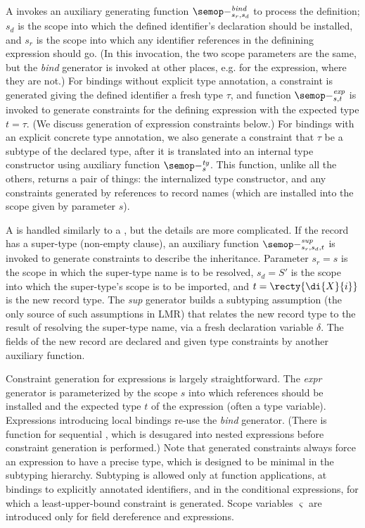 A  invokes an auxiliary generating function $\sema{bind}{-}{s_r,s_d}$ to process the
definition; $s_d$ is the scope into which the defined identifier's declaration should be installed, and $s_r$
is the scope into which any identifier references in the definining expression should go. (In this invocation,
the two scope parameters are the same, but the {\it bind} generator is invoked at other places, e.g.
for the  expression, where they are not.)  For bindings without explicit type annotation,
a constraint is generated giving the defined identifier a fresh type $\tau$, and function $\sema{exp}{-}{s,t}$
is invoked to generate constraints for the defining expression with the expected type $t=\tau$.
(We discuss generation of expression constraints below.)
For bindings with an explicit concrete type annotation, we also generate a constraint that $\tau$ be a subtype
of the declared type, after it is translated into an internal type constructor
using auxiliary function $\sema{ty}{-}{s}$. This function, unlike all the others, returns a pair of things:
the internalized type constructor, and any constraints generated by references to record names (which are
installed into the scope given by parameter $s$).

A  is handled similarly to a , but the details are more complicated. If the
record has a super-type (non-empty  clause), an auxiliary function $\sema{sup}{-}{s_r,s_d,t}$ 
is invoked to generate constraints to describe the inheritance.
Parameter $s_r=s$ is the scope in which the super-type name is to be resolved,
$s_d=S'$ is the scope into which the super-type's scope is to be imported, and $t=\recty{\di{X}{i}}$ 
is the new record type. The {\it sup} generator builds a subtyping assumption (the only
source of such assumptions in LMR) that relates the new record type to the result of resolving the
super-type name, via a fresh declaration variable $\delta$. The fields of the new record are
declared and given type constraints by another auxiliary function.


Constraint generation for expressions is largely straightforward. The {\it expr} 
generator is parameterized by the scope $s$ into which references should be installed
and the expected type $t$ of the expression (often a type variable). Expressions 
introducing local bindings re-use the {\it bind} generator. (There is
function for sequential , which is desugared into nested 
expressions before constraint generation is performed.)
Note that generated constraints always force an expression to have a precise type, which is
designed to be minimal in the subtyping hierarchy. Subtyping is allowed only at
function applications, at bindings to explicitly annotated identifiers, and in
the conditional expressions, for which a least-upper-bound constraint is generated.
Scope variables $\varsigma$ are introduced only for field dereference and 
expressions. 

